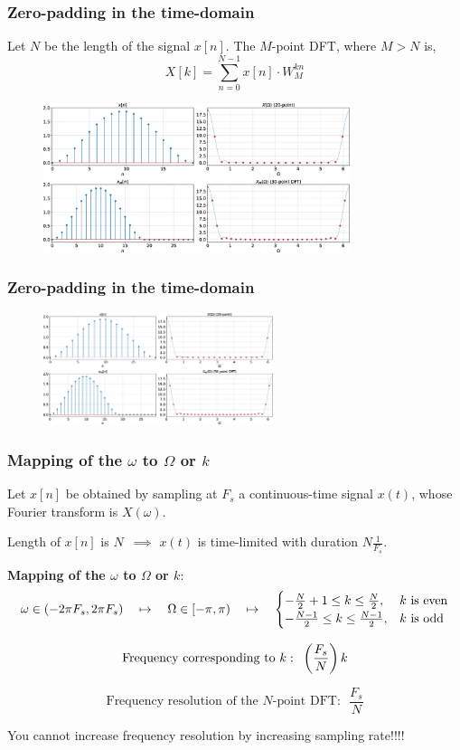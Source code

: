 \documentclass[aspectratio=169]{beamer}
\def\lp{\ensuremath\left(}
\def\rp{\ensuremath\right)}
\begin{document}
\begin{frame}[t]
  \frametitle{Zero-padding in the time-domain}
  Let $N$ be the length of the signal $x[n]$. The $M$-point DFT, where $M > N$ is,
  \vspace{-0.2cm}
  \[  X[k] = \sum_{n=0}^{N-1} x[n] \cdot W_M^{kn} \] 
  \vspace{-0.5cm}
  \begin{figure}
  \centering
  \includegraphics[width=0.8\textwidth]{img/oversampling.eps}
  \end{figure}
\end{frame}


\begin{frame}[t]
  \frametitle{Zero-padding in the time-domain}
  \begin{figure}
  \centering
  \includegraphics[width=0.6\textwidth, left]{img/oversampling.eps}
  \end{figure}
\end{frame}


\begin{frame}[t]
  \frametitle{Mapping of the $\omega$ to $\Omega$ or $k$}
  Let $x[n]$ be obtained by sampling at $F_s$ a continuous-time signal $x(t)$, whose Fourier transform is $X(\omega)$. 
  \vspace{0.25cm}

  Length of $x[n]$ is $N \,\,\, \implies \,\, x(t)$ is time-limited with duration $N\frac{1}{F_s}$.
  \vspace{0.5cm}

  \textbf{Mapping of the $\omega$ to $\Omega$ or $k$}:
  \[ \omega \in \lp -2\pi F_s, 2\pi F_s \rp \quad \mapsto \quad \Omega \in [-\pi, \pi) \quad \mapsto \quad \begin{cases} -\frac{N}{2} + 1 \leq k \leq \frac{N}{2}, & k \text{ is even} \\
  -\frac{N-1}{2} \leq k \leq \frac{N-1}{2}, & k \text{ is odd}
  \end{cases} \]

  \[ \text{Frequency corresponding to } k: \,\,\, \lp \frac{F_s}{N}\rp k \]

  \[ \text{Frequency resolution of the } N \text{-point DFT}: \,\,\, \frac{F_s}{N} \]

  You cannot increase frequency resolution by increasing sampling rate!!!!
\end{frame}
\end{document}
